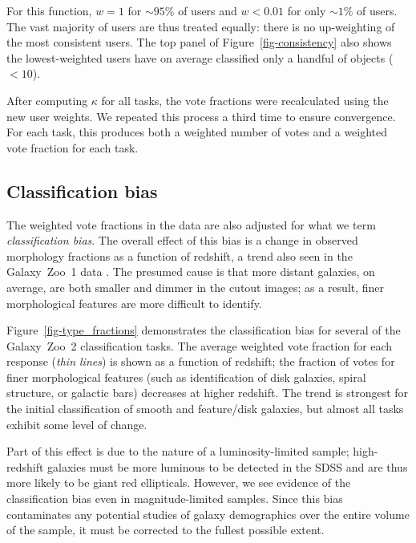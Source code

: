 \documentclass[useAMS,usenatbib]{mn2e}
\begin{document}
\noindent For this function, $w=1$ for $\sim95\%$ of users and $w<0.01$ for only $\sim1\%$ of users. The vast majority of users are thus treated equally: there is no up-weighting of the most consistent users. The top panel of Figure~\ref{fig-consistency} also shows the lowest-weighted users have on average classified only a handful of objects ($<10$).

After computing $\kappa$ for all tasks, the vote fractions were recalculated using the new user weights. We repeated this process a third time to ensure convergence. For each task, this produces both a weighted number of votes and a weighted vote fraction for each task. 

\subsection{Classification bias}\label{ssec-classificationbias}

The weighted vote fractions in the data are also adjusted for what we term {\it classification bias}. The overall effect of this bias is a change in observed morphology fractions as a function of redshift, a trend also seen in the Galaxy~Zoo~1 data \citep{bam09}. The presumed cause is that more distant galaxies, on average, are both smaller and dimmer in the cutout images; as a result, finer morphological features are more difficult to identify. 

Figure~\ref{fig-type_fractions} demonstrates the classification bias for several of the Galaxy~Zoo~2 classification tasks. The average weighted vote fraction for each response ({\it thin lines}) is shown as a function of redshift; the fraction of votes for finer morphological features (such as identification of disk galaxies, spiral structure, or galactic bars) decreases at higher redshift. The trend is strongest for the initial classification of smooth and feature/disk galaxies, but almost all tasks exhibit some level of change. 

Part of this effect is due to the nature of a luminosity-limited sample; high-redshift galaxies must be more luminous to be detected in the SDSS and are thus more likely to be giant red ellipticals. However, we see evidence of the classification bias even in magnitude-limited samples. Since this bias contaminates any potential studies of galaxy demographics over the entire volume of the sample, it must be corrected to the fullest possible extent. 
\end{document}

